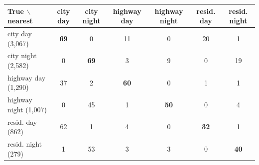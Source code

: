 \begin{tabular}{lcccccc}
\toprule
True $\backslash$ nearest & city day & city night & highway day & highway night & resid. day & resid. night \\
\midrule
city day (3,067) & \textbf{69} & 0 & 11 & 0 & 20 & 1 \\
city night (2,582) & 0 & \textbf{69} & 3 & 9 & 0 & 19 \\
highway day (1,290) & 37 & 2 & \textbf{60} & 0 & 1 & 1 \\
highway night (1,007) & 0 & 45 & 1 & \textbf{50} & 0 & 4 \\
resid. day (862) & 62 & 1 & 4 & 0 & \textbf{32} & 1 \\
resid. night (279) & 1 & 53 & 3 & 3 & 0 & \textbf{40} \\
\bottomrule
\end{tabular}
